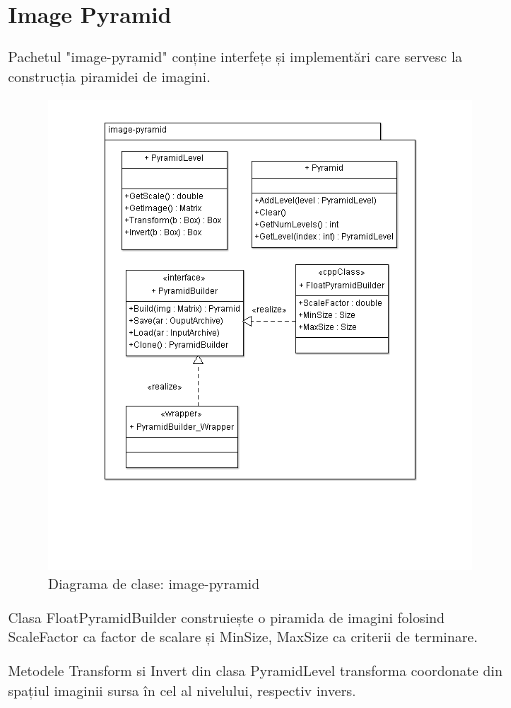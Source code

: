 \subsection{Image Pyramid}
Pachetul "image-pyramid" conține interfețe și implementări care servesc la construcția piramidei de imagini.
\begin{figure}[H]
	\centering
	\includegraphics[width=1.00\textwidth]{uml/imagepyramidClassDiagram.png}
	\caption{Diagrama de clase: image-pyramid}
	\label{fig:imagepyramidClassDiagram}
\end{figure}


Clasa FloatPyramidBuilder construiește o piramida de imagini folosind ScaleFactor ca factor de scalare și MinSize, MaxSize ca criterii de terminare.

Metodele Transform si Invert din clasa PyramidLevel transforma coordonate din spațiul imaginii sursa în cel al nivelului, respectiv invers.

